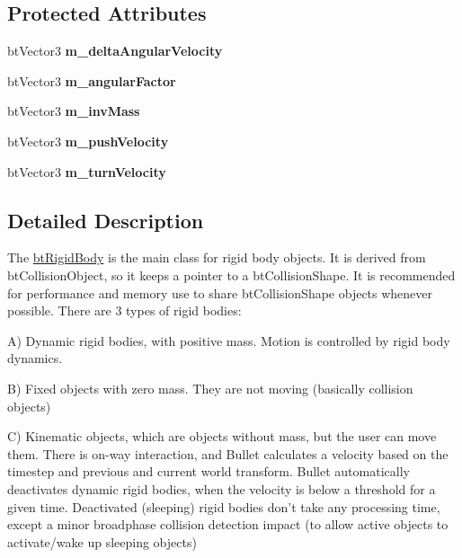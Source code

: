 \subsection*{Protected Attributes}
\begin{DoxyCompactItemize}
\item 
\hypertarget{classbt_rigid_body_a9572a43e28f91ababaa1e7f717ed8975}{bt\+Vector3 {\bfseries m\+\_\+delta\+Angular\+Velocity}}\label{classbt_rigid_body_a9572a43e28f91ababaa1e7f717ed8975}

\item 
\hypertarget{classbt_rigid_body_a8010986d82f1d721f5a50b2019cb5a80}{bt\+Vector3 {\bfseries m\+\_\+angular\+Factor}}\label{classbt_rigid_body_a8010986d82f1d721f5a50b2019cb5a80}

\item 
\hypertarget{classbt_rigid_body_afbfac64b1739b84137ca1787e9ce8505}{bt\+Vector3 {\bfseries m\+\_\+inv\+Mass}}\label{classbt_rigid_body_afbfac64b1739b84137ca1787e9ce8505}

\item 
\hypertarget{classbt_rigid_body_a9b6d67f30ca4df6b7668ddd40797e42f}{bt\+Vector3 {\bfseries m\+\_\+push\+Velocity}}\label{classbt_rigid_body_a9b6d67f30ca4df6b7668ddd40797e42f}

\item 
\hypertarget{classbt_rigid_body_a518a768b3357fe5da25202c1ddc5b335}{bt\+Vector3 {\bfseries m\+\_\+turn\+Velocity}}\label{classbt_rigid_body_a518a768b3357fe5da25202c1ddc5b335}

\end{DoxyCompactItemize}


\subsection{Detailed Description}
The \hyperlink{classbt_rigid_body}{bt\+Rigid\+Body} is the main class for rigid body objects. It is derived from bt\+Collision\+Object, so it keeps a pointer to a bt\+Collision\+Shape. It is recommended for performance and memory use to share bt\+Collision\+Shape objects whenever possible. There are 3 types of rigid bodies\+:
\begin{DoxyItemize}
\item A) Dynamic rigid bodies, with positive mass. Motion is controlled by rigid body dynamics.
\item B) Fixed objects with zero mass. They are not moving (basically collision objects)
\item C) Kinematic objects, which are objects without mass, but the user can move them. There is on-\/way interaction, and Bullet calculates a velocity based on the timestep and previous and current world transform. Bullet automatically deactivates dynamic rigid bodies, when the velocity is below a threshold for a given time. Deactivated (sleeping) rigid bodies don't take any processing time, except a minor broadphase collision detection impact (to allow active objects to activate/wake up sleeping objects) 
\end{DoxyItemize}

